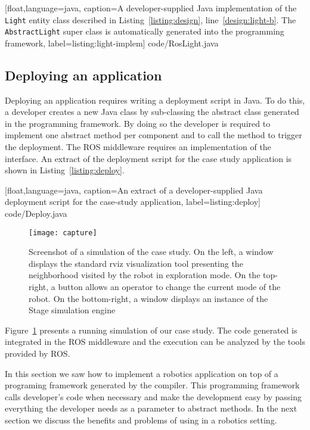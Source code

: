 %
[float,language=java,%
caption={A developer-supplied Java implementation of the
  \texttt{Light} entity class described in
  Listing~\ref{listing:design}, line~\ref{design:light-b}. The
  \texttt{Abstract\-Light} super class is automatically generated into
  the programming framework},%
label={listing:light-implem}]%
{code/RosLight.java}

\subsection{Deploying an application}

Deploying an application requires writing a deployment script in Java.
To do this, a developer creates a new Java class by sub-classing the
abstract class  generated in the programming framework.
By doing so the developer is required to implement one abstract method
per component and to call the  method to trigger the
deployment. The ROS middleware requires an implementation of the
 interface. An extract of the deployment script for the
case study application is shown in Listing~\ref{listing:deploy}.

%
[float,language=java,%
caption={An extract of a developer-supplied Java deployment script for
  the case-study application},%
label={listing:deploy}]%
{code/Deploy.java}


\begin{figure}
  \centering
 \texttt{[image: capture]}
 \caption{Screenshot of a simulation of the case study. On the left, a
   window displays the standard rviz visualization tool presenting the
   neighborhood visited by the robot in exploration mode. On the
   top-right, a button allows an operator to change the current mode
   of the robot. On the bottom-right, a window displays an instance of
   the Stage simulation engine}
\label{fig:diaspec-simulation}
\end{figure}

Figure~\ref{fig:diaspec-simulation} presents a running simulation of
our case study. The code generated is integrated in the ROS middleware
and the execution can be analyzed by the tools provided by ROS.

In this section we saw how to implement a robotics application on top
of a programing framework generated by the \diaspec{} compiler. This
programming framework calls developer's code when necessary and make
the development easy by passing everything the developer needs as a
parameter to abstract methods. In the next section we discuss the
benefits and problems of using \diaspec{} in a robotics setting.
